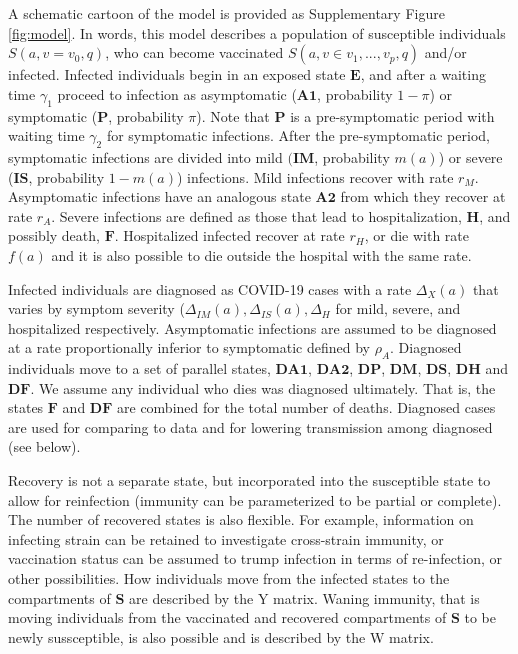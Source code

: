 \documentclass[11pt]{article}
\begin{document}
A schematic cartoon of the model is provided as Supplementary Figure \ref{fig:model}. In words, this model describes a population of susceptible individuals $S(a,v=v_0,q)$, who can become vaccinated $S(a,v \in v_1,...,v_p,q)$ and/or infected. Infected individuals begin in an exposed state $\mathbf{E}$, and after a waiting time $\gamma_1$ proceed to infection as asymptomatic ($\mathbf{A1}$, probability $1-\pi$) or symptomatic ($\mathbf{P}$, probability $\pi$). Note that $\mathbf{P}$ is a pre-symptomatic period with waiting time $\gamma_2$ for symptomatic infections. After the pre-symptomatic period, symptomatic infections are divided into mild $(\mathbf{IM}$, probability $m(a)$) or severe ($\mathbf{IS}$, probability $1-m(a)$) infections. Mild infections recover with rate $r_M$. Asymptomatic infections have an analogous state $\mathbf{A2}$ from which they recover at rate $r_A$. Severe infections are defined as those that lead to hospitalization, $\mathbf{H}$, and possibly death, $\mathbf{F}$. Hospitalized infected recover at rate $r_H$, or die with rate $f(a)$ and it is also possible to die outside the hospital with the same rate. 

Infected individuals are diagnosed as COVID-19 cases with a rate $\Delta_X(a)$ that varies by symptom severity ($\Delta_{IM}(a), \Delta_{IS}(a), \Delta_{H}$ for mild, severe, and hospitalized respectively. Asymptomatic infections are assumed to be diagnosed at a rate proportionally inferior to symptomatic defined by $\rho_A$. Diagnosed individuals move to a set of parallel states, $\mathbf{DA1}$, $\mathbf{DA2}$, $\mathbf{DP}$, $\mathbf{DM}$, $\mathbf{DS}$, $\mathbf{DH}$ and $\mathbf{DF}$. We assume any individual who dies was diagnosed ultimately. That is, the states $\mathbf{F}$ and $\mathbf{DF}$ are combined for the total number of deaths. Diagnosed cases are used for comparing to data and for lowering transmission among diagnosed (see below).

Recovery is not a separate state, but incorporated into the susceptible state to allow for reinfection (immunity can be parameterized to be partial or complete). The number of recovered states is also flexible. For example, information on infecting strain can be retained to investigate cross-strain immunity, or vaccination status can be assumed to trump infection in terms of re-infection, or other possibilities. How individuals move from the infected states to the compartments of $\mathbf{S}$ are described by the Y matrix. Waning immunity, that is moving individuals from the vaccinated and recovered compartments of $\mathbf{S}$ to be newly sussceptible, is also possible and is described by the W matrix.
\end{document}
